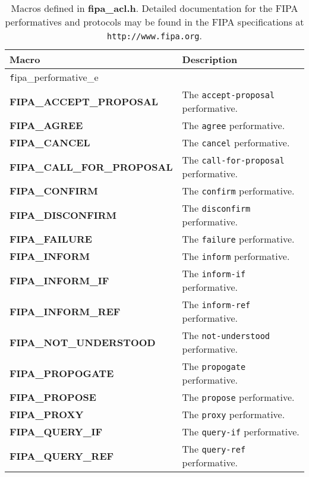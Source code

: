 \begin{table}[!hp]
\capstart
\begin{center}
\caption{Macros defined in {\bf fipa\_acl.h}. Detailed documentation for the
FIPA performatives and protocols may be found in the FIPA specifications at
\texttt{http://www.fipa.org}.}
\begin{tabular}{p{90 mm}p{70 mm}}
\hline
Macro & Description \\
\hline
{\texttt fipa\_performative\_e \index{fipa\_performative\_e}} & \\
\hline
{\bf FIPA\_ACCEPT\_PROPOSAL} \index{FIPA\_ACCEPT\_PROPOSAL} & The \texttt{accept-proposal} performative. \\
{\bf FIPA\_AGREE} \index{FIPA\_AGREE} & The \texttt{agree} performative. \\
{\bf FIPA\_CANCEL} \index{FIPA\_CANCEL} & The \texttt{cancel} performative. \\
{\bf FIPA\_CALL\_FOR\_PROPOSAL} \index{FIPA\_CALL\_FOR\_PROPOSAL} & The \texttt{call-for-proposal} performative. \\
{\bf FIPA\_CONFIRM} \index{FIPA\_CONFIRM} & The \texttt{confirm} performative. \\
{\bf FIPA\_DISCONFIRM} \index{FIPA\_DISCONFIRM} & The \texttt{disconfirm} performative. \\
{\bf FIPA\_FAILURE} \index{FIPA\_FAILURE} & The \texttt{failure} performative. \\
{\bf FIPA\_INFORM} \index{FIPA\_INFORM} & The \texttt{inform} performative. \\
{\bf FIPA\_INFORM\_IF} \index{FIPA\_INFORM\_IF} & The \texttt{inform-if} performative. \\
{\bf FIPA\_INFORM\_REF} \index{FIPA\_INFORM\_REF} & The \texttt{inform-ref} performative. \\
{\bf FIPA\_NOT\_UNDERSTOOD} \index{FIPA\_NOT\_UNDERSTOOD} & The \texttt{not-understood} performative. \\
{\bf FIPA\_PROPOGATE} \index{FIPA\_PROPOGATE} & The \texttt{propogate} performative. \\
{\bf FIPA\_PROPOSE} \index{FIPA\_PROPOSE} & The \texttt{propose} performative. \\
{\bf FIPA\_PROXY} \index{FIPA\_PROXY} & The \texttt{proxy} performative. \\
{\bf FIPA\_QUERY\_IF} \index{FIPA\_QUERY\_IF} & The \texttt{query-if} performative. \\
{\bf FIPA\_QUERY\_REF} \index{FIPA\_QUERY\_REF} & The \texttt{query-ref} performative. \\

\end{tabular}
\end{center}
\end{table}
